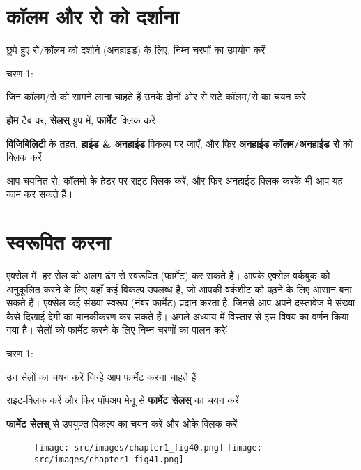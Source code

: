 \section{कॉलम और रो को दर्शाना}\label{id-1.20}

छुपे हुए रो/कॉलम को दर्शाने (अनहाइड) के लिए, निम्न चरणों का उपयोग करेंः

\begin{descriptionSimple}{चरण 1:}
\item[चरण 1] जिन कॉलम/रो को सामने लाना चाहते हैं उनके दोनों ओर से सटे कॉलम/रो का चयन करे
\item[चरण 2] \textbf{होम} टैब पर, \textbf{सेलस्} ग्रुप में, \textbf{फार्मेट} क्लिक करें
\item[चरण 3] \textbf{विजिबिलिटी} के तहत, \textbf{हाईड \& अनहाईड} विकल्प पर जाएँ, और फिर \textbf{अनहाईड कॉलम/अनहाईड रो} को क्लिक करें
\end{descriptionSimple}

आप चयनित रो, कॉलमो के हेडर पर राइट-क्लिक करें, और फिर अनहाईड क्लिक करकें भी आप यह काम कर सकते हैं।

									
\section{स्वरूपित करना}\label{id-1.21}

एक्सेल में, हर सेल को अलग ढंग से स्वरूपित (फार्मेट) कर सकते हैं। आपके एक्सेल वर्कबुक को अनुकूलित करने के लिए यहाँ कई विकल्प उपलब्ध हैं, जो आपकी वर्कशीट को पढ़ने के लिए आसान बना सकते हैं। एक्सेल कई संख्या स्वरूप (नंबर फार्मेट) प्रदान करता है, जिनसे आप अपने दस्तावेज मे संख्या कैसे दिखाई देगी का मानकीकरण कर सकते हैं। अगले अध्याय में विस्तार से इस विषय का वर्णन किया गया है। सेलों को फार्मेट करने के लिए निम्न चरणों का पालन करेःं

\begin{descriptionSimple}{चरण 1:}
\item[चरण 1] उन सेलों का चयन करें जिन्हे आप फार्मेट करना चाहते हैं
\item[चरण 2] राइट-क्लिक करें और फिर पॉपअप मेनू से \textbf{फार्मेट सेलस्} का चयन करें
\item[चरण 3] \textbf{फार्मेट सेलस्} से उपयुक्त विकल्प का चयन करें और ओके क्लिक करें
\end{descriptionSimple}
\begin{figure}[H]
\centering
\texttt{[image: src/images/chapter1\_fig40.png]}\qquad
\texttt{[image: src/images/chapter1\_fig41.png]}
\end{figure}								
	
